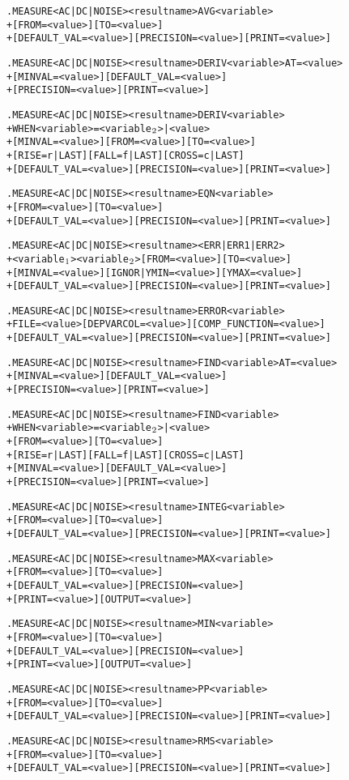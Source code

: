 \begin{Command}
\begin{alltt}
.MEASURE <AC|DC|NOISE> <result name> AVG <variable>
+ [FROM=<value>] [TO=<value>]
+ [DEFAULT_VAL=<value>] [PRECISION=<value>] [PRINT=<value>]

.MEASURE <AC|DC|NOISE> <result name> DERIV <variable> AT=<value>
+ [MINVAL=<value>] [DEFAULT_VAL=<value>]
+ [PRECISION=<value>] [PRINT=<value>]

.MEASURE <AC|DC|NOISE> <result name> DERIV <variable>
+ WHEN <variable>=<variable\(\sb{2}\)>|<value>
+ [MINVAL=<value>] [FROM=<value>] [TO=<value>]
+ [RISE=r|LAST] [FALL=f|LAST] [CROSS=c|LAST]
+ [DEFAULT_VAL=<value>] [PRECISION=<value>] [PRINT=<value>]

.MEASURE <AC|DC|NOISE> <result name> EQN <variable>
+ [FROM=<value>] [TO=<value>] 
+ [DEFAULT_VAL=<value>] [PRECISION=<value>] [PRINT=<value>]

.MEASURE <AC|DC|NOISE> <result name> <ERR|ERR1|ERR2>
+ <variable\(\sb{1}\)> <variable\(\sb{2}\)> [FROM=<value>] [TO=<value>]
+ [MINVAL=<value>] [IGNOR|YMIN=<value>] [YMAX=<value>]
+ [DEFAULT_VAL=<value>] [PRECISION=<value>] [PRINT=<value>]

.MEASURE <AC|DC|NOISE> <result name> ERROR <variable>
+ FILE=<value> [DEPVARCOL=<value>] [COMP_FUNCTION=<value>]
+ [DEFAULT_VAL=<value>] [PRECISION=<value>] [PRINT=<value>]

.MEASURE <AC|DC|NOISE> <result name> FIND <variable> AT=<value>
+ [MINVAL=<value>] [DEFAULT_VAL=<value>]
+ [PRECISION=<value>] [PRINT=<value>]

.MEASURE <AC|DC|NOISE> <result name> FIND <variable>
+ WHEN <variable>=<variable\(\sb{2}\)>|<value>
+ [FROM=<value>] [TO=<value>]
+ [RISE=r|LAST] [FALL=f|LAST] [CROSS=c|LAST]
+ [MINVAL=<value>] [DEFAULT_VAL=<value>]
+ [PRECISION=<value>] [PRINT=<value>]

.MEASURE <AC|DC|NOISE> <result name> INTEG <variable>
+ [FROM=<value>] [TO=<value>]
+ [DEFAULT_VAL=<value>] [PRECISION=<value>] [PRINT=<value>]

.MEASURE <AC|DC|NOISE> <result name> MAX <variable>
+ [FROM=<value>] [TO=<value>] 
+ [DEFAULT_VAL=<value>] [PRECISION=<value>] 
+ [PRINT=<value>] [OUTPUT=<value>]

.MEASURE <AC|DC|NOISE> <result name> MIN <variable>
+ [FROM=<value>] [TO=<value>] 
+ [DEFAULT_VAL=<value>] [PRECISION=<value>]
+ [PRINT=<value>] [OUTPUT=<value>]

.MEASURE <AC|DC|NOISE> <result name> PP <variable>
+ [FROM=<value>] [TO=<value>] 
+ [DEFAULT_VAL=<value>] [PRECISION=<value>] [PRINT=<value>]

.MEASURE <AC|DC|NOISE> <result name> RMS <variable>
+ [FROM=<value>] [TO=<value>]
+ [DEFAULT_VAL=<value>] [PRECISION=<value>] [PRINT=<value>]


\end{alltt}
\end{Command}
